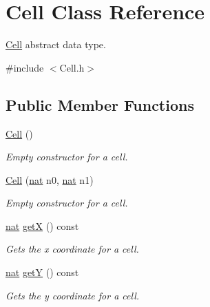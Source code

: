 \hypertarget{class_cell}{}\section{Cell Class Reference}
\label{class_cell}


\hyperlink{class_cell}{Cell} abstract data type.  




{\ttfamily \#include $<$Cell.\+h$>$}

\subsection*{Public Member Functions}
\begin{DoxyCompactItemize}
\item 
\mbox{\label{class_cell_a394510643e8664cf12b5efaf5cb99f71}} 
\hyperlink{class_cell_a394510643e8664cf12b5efaf5cb99f71}{Cell} ()
\begin{DoxyCompactList}\small\item\em Empty constructor for a cell. \end{DoxyCompactList}\item 
\hyperlink{class_cell_a79448546aec44bac1be25a271d256f2a}{Cell} (\hyperlink{_cell_types_8h_a56638ee9d162e8cce3a15f92d2023d6e}{nat} n0, \hyperlink{_cell_types_8h_a56638ee9d162e8cce3a15f92d2023d6e}{nat} n1)
\begin{DoxyCompactList}\small\item\em Empty constructor for a cell. \end{DoxyCompactList}\item 
\mbox{\label{class_cell_a3a5168898f7ce737fcbfe422a8812a57}} 
\hyperlink{_cell_types_8h_a56638ee9d162e8cce3a15f92d2023d6e}{nat} \hyperlink{class_cell_a3a5168898f7ce737fcbfe422a8812a57}{getX} () const
\begin{DoxyCompactList}\small\item\em Gets the x coordinate for a cell. \end{DoxyCompactList}\item 
\mbox{\label{class_cell_ab9c330c150fba60c8bf1ec21442f7c54}} 
\hyperlink{_cell_types_8h_a56638ee9d162e8cce3a15f92d2023d6e}{nat} \hyperlink{class_cell_ab9c330c150fba60c8bf1ec21442f7c54}{getY} () const
\begin{DoxyCompactList}\small\item\em Gets the y coordinate for a cell. \end{DoxyCompactList}\item 

\end{DoxyCompactItemize}

